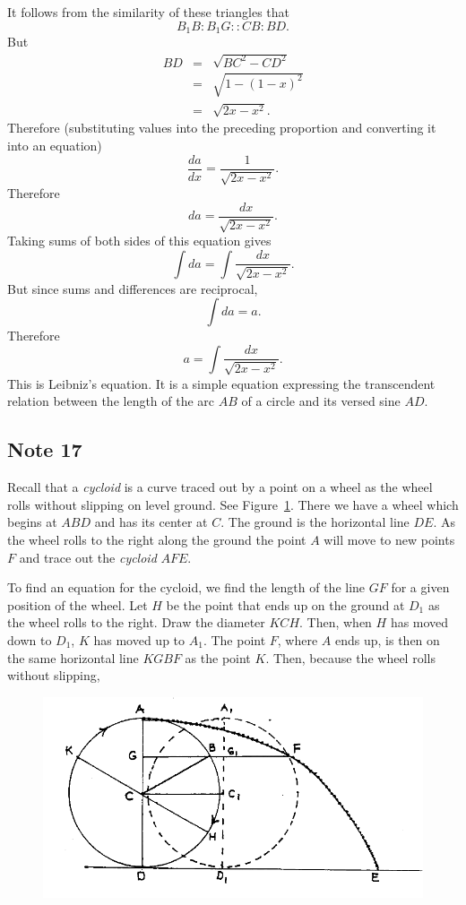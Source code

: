\documentclass[polutonikogreek,english,twoside,openright]{article}
\begin{document}
It follows from the similarity of these triangles that
$$B_1B\!:\! B_1G :: CB\!:\!BD.$$
But
\begin{eqnarray*}
BD&  = & \sqrt{BC^2 - CD^2} \\
& = & \sqrt{1-(1-x)^2}\\
& = & \sqrt{2x -x^2}.\label{sinelength}
\end{eqnarray*}
Therefore (substituting values into the preceding proportion and converting it into an equation)
$$\frac{da}{dx} = \frac{1}{\sqrt{2x-x^2}}.$$ Therefore 
$$da = \frac{dx}{\sqrt{2x-x^2}}.$$
Taking sums of both sides of this equation gives
$$\int\! da =  \int\!\frac{dx}{\sqrt{2x-x^2}}.$$
But since sums and differences are reciprocal,
$$\int\! da = a.$$
Therefore
$$\label{ecircarc} a = \int\!\frac{dx}{\sqrt{2x-x^2}}.$$
This is Leibniz's equation.  It is a simple equation expressing the
transcendent relation between the length of the arc $AB$ of a circle
and its versed sine $AD$.

\subsection*{Note 17}
\label{crg17}

\label{cycloid} Recall that a {\em cycloid} is a curve traced out by a
point on a wheel as the wheel rolls without slipping on level ground.
See Figure~\ref{cyceqfig}.  There we have a wheel which begins at
$ABD$ and has its center at $C$.  The ground is the horizontal line
$DE$.  As the wheel rolls to the right along the ground the point $A$
will move to new points $F$ and trace out the {\em cycloid} $AFE$.

To find an equation for the cycloid, we find the length of the line
$GF$ for a given position of the wheel.  Let $H$ be the point that
ends up on the ground at $D_1$ as the wheel rolls to the right.  Draw
the diameter $KCH$.  Then, when $H$ has moved down to $D_1$, $K$ has
moved up to $A_1$. The point $F$, where $A$ ends up, is then on the
same horizontal line $KGBF$ as the point $K$.  Then, because the wheel
rolls without slipping,
\begin{figure}[htp]
\begin{center}
\includegraphics[width=\textwidth]{fig/Figure43}
\caption{}
\label{cyceqfig}
\vspace{-10pt}
\end{center}
\end{figure} 
\end{document}
